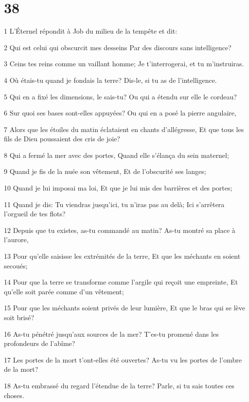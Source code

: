 \chapter{38}

\par 1 L'Éternel répondit à Job du milieu de la tempête et dit:
\par 2 Qui est celui qui obscurcit mes desseins Par des discours sans intelligence?
\par 3 Ceins tes reins comme un vaillant homme; Je t'interrogerai, et tu m'instruiras.
\par 4 Où étais-tu quand je fondais la terre? Dis-le, si tu as de l'intelligence.
\par 5 Qui en a fixé les dimensions, le sais-tu? Ou qui a étendu sur elle le cordeau?
\par 6 Sur quoi ses bases sont-elles appuyées? Ou qui en a posé la pierre angulaire,
\par 7 Alors que les étoiles du matin éclataient en chants d'allégresse, Et que tous les fils de Dieu poussaient des cris de joie?
\par 8 Qui a fermé la mer avec des portes, Quand elle s'élança du sein maternel;
\par 9 Quand je fis de la nuée son vêtement, Et de l'obscurité ses langes;
\par 10 Quand je lui imposai ma loi, Et que je lui mis des barrières et des portes;
\par 11 Quand je dis: Tu viendras jusqu'ici, tu n'iras pas au delà; Ici s'arrêtera l'orgueil de tes flots?
\par 12 Depuis que tu existes, as-tu commandé au matin? As-tu montré sa place à l'aurore,
\par 13 Pour qu'elle saisisse les extrémités de la terre, Et que les méchants en soient secoués;
\par 14 Pour que la terre se transforme comme l'argile qui reçoit une empreinte, Et qu'elle soit parée comme d'un vêtement;
\par 15 Pour que les méchants soient privés de leur lumière, Et que le bras qui se lève soit brisé?
\par 16 As-tu pénétré jusqu'aux sources de la mer? T'es-tu promené dans les profondeurs de l'abîme?
\par 17 Les portes de la mort t'ont-elles été ouvertes? As-tu vu les portes de l'ombre de la mort?
\par 18 As-tu embrassé du regard l'étendue de la terre? Parle, si tu sais toutes ces choses.
